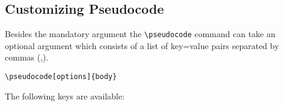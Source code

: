 \documentclass[a4paper]{report}
\begin{document}
\subsection{Customizing Pseudocode}

Besides the mandatory argument the \lstinline{\pseudocode} command can take an optional argument which consists of a list of key=value pairs
separated by commas (,).
\begin{lstlisting}
\pseudocode[options]{body}
\end{lstlisting}
The following keys are available:
\end{document}
